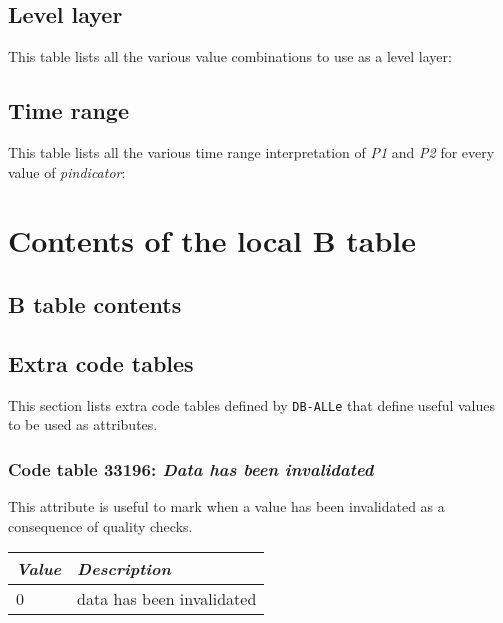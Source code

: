 \documentclass[final,12pt,a4paper,twoside]{book}
\newcommand{\dballe}{{\tt DB-ALLe}}
\begin{document}
\section{Level layer}
\label{levels}

This table lists all the various value combinations to use as a level layer:



\section{Time range}
\label{tranges}

This table lists all the various time range interpretation of \emph{P1} and
\emph{P2} for every value of \emph{pindicator}:



\chapter{Contents of the local B table}

\section{B table contents}

\label{btable}


\section{Extra code tables}
\label{extract}

This section lists extra code tables defined by \dballe{} that define useful
values to be used as attributes.

\subsection{Code table 33196: \emph{Data has been invalidated}}

This attribute is useful to mark when a value has been invalidated as a
consequence of quality checks.

\begin{tabular}{|l|l|}
\hline
{\em Value} & {\em Description}               \\
\hline
          0 & data has been invalidated       \\
\hline
\end{tabular}
\end{document}

